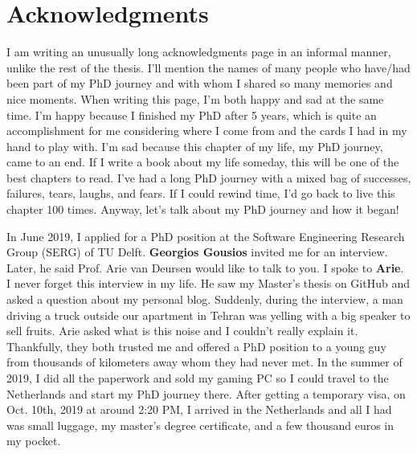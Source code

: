 \chapter*{Acknowledgments}

I am writing an unusually long acknowledgments page in an informal manner, unlike the rest of the thesis. I'll mention the names of many people who have/had been part of my PhD journey and with whom I shared so many memories and nice moments. When writing this page, I'm both happy and sad at the same time. I'm happy because I finished my PhD after 5 years, which is quite an accomplishment for me considering where I come from and the cards I had in my hand to play with. I'm sad because this chapter of my life, my PhD journey, came to an end. If I write a book about my life someday, this will be one of the best chapters to read. I've had a long PhD journey with a mixed bag of successes, failures, tears, laughs, and fears. If I could rewind time, I'd go back to live this chapter 100 times. Anyway, let's talk about my PhD journey and how it began!

In June 2019, I applied for a PhD position at the Software Engineering Research Group (SERG) of TU Delft. \textbf{Georgios Gousios} invited me for an interview. Later, he said Prof. Arie van Deursen would like to talk to you. I spoke to \textbf{Arie}. I never forget this interview in my life. He saw my Master's thesis on GitHub and asked a question about my personal blog. Suddenly, during the interview, a man driving a truck outside our apartment in Tehran was yelling with a big speaker to sell fruits. Arie asked what is this noise and I couldn't really explain it. Thankfully, they both trusted me and offered a PhD position to a young guy from thousands of kilometers away whom they had never met. In the summer of 2019, I did all the paperwork and sold my gaming PC so I could travel to the Netherlands and start my PhD journey there. After getting a temporary visa, on Oct. 10th, 2019 at around 2:20 PM, I arrived in the Netherlands and all I had was small luggage, my master's degree certificate, and a few thousand euros in my pocket.

